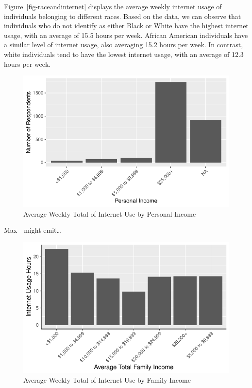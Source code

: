 \documentclass[
  letterpaper,
  DIV=11,
  numbers=noendperiod]{scrartcl}
\begin{document}
Figure~\ref{fig-raceandinternet} displays the average weekly internet
usage of individuals belonging to different races. Based on the data, we
can observe that individuals who do not identify as either Black or
White have the highest internet usage, with an average of 15.5 hours per
week. African American individuals have a similar level of internet
usage, also averaging 15.2 hours per week. In contrast, white
individuals tend to have the lowest internet usage, with an average of
12.3 hours per week.

\begin{figure}

{\centering \includegraphics{paper_files/figure-pdf/fig-personalincomeandinternet-1.pdf}

}

\caption{\label{fig-personalincomeandinternet}Average Weekly Total of
Internet Use by Personal Income}

\end{figure}

Max - might emit\ldots{}

\begin{figure}

{\centering \includegraphics{paper_files/figure-pdf/fig-familyincomeandinternet-1.pdf}

}

\caption{\label{fig-familyincomeandinternet-1}Average Weekly Total of
Internet Use by Family Income}

\end{figure}
\end{document}
